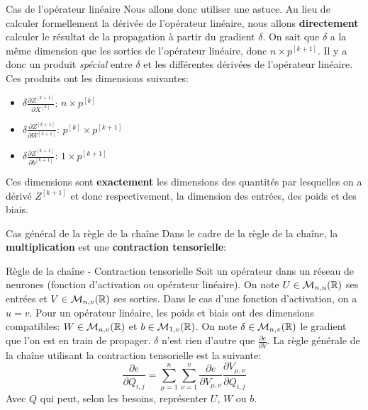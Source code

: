 \begin{frame}{Cas de l'opérateur linéaire}
	Nous allons donc utiliser une astuce. Au lieu de calculer formellement la dérivée de l'opérateur linéaire, nous allons \textbf{directement} calculer le résultat de la propagation à partir du gradient $\delta$. On sait que $\delta$ a la même dimension que les sorties de l'opérateur linéaire, donc $n \times p^{[k+1]}$. Il y a donc un produit \textit{spécial} entre $\delta$ et les différentes dérivées de l'opérateur linéaire. Ces produits ont les dimensions suivantes:
	
	\begin{itemize}
		\item $\delta \frac{\partial{Z^{[k+1]}}}{\partial{X^{[k]}}}$: $n \times p^{[k]}$
		\item $\delta \frac{\partial{Z^{[k+1]}}}{\partial{W^{[k+1]}}}$: $p^{[k]} \times p^{[k+1]}$
		\item $\delta \frac{\partial{Z^{[k+1]}}}{\partial{b^{[k+1]}}}$: $1 \times p^{[k+1]}$
	\end{itemize}
	
	Ces dimensions sont \textbf{exactement} les dimensions des quantités par lesquelles on a dérivé $Z^{[k+1]}$ et donc respectivement, la dimension des entrées, des poids et des biais.
\end{frame}

\begin{frame}{Cas général de la règle de la chaîne}
	Dans le cadre de la règle de la chaîne, la \textbf{multiplication} est une \textbf{contraction tensorielle}:
	
	\begin{block}{Règle de la chaîne - Contraction tensorielle}
		Soit un opérateur dans un réseau de neurones (fonction d'activation ou opérateur linéaire). On note $U \in \mathcal{M}_{n, u}(\mathbb{R})$ ses entrées et $V \in \mathcal{M}_{n, v}(\mathbb{R})$ ses sorties. Dans le cas d'une fonction d'activation, on a $u = v$. Pour un opérateur linéaire, les poids et biais ont des dimensions compatibles: $W \in \mathcal{M}_{u, v}(\mathbb{R})$ et $b \in \mathcal{M}_{1, v}(\mathbb{R})$. On note $\delta \in \mathcal{M}_{n, v}(\mathbb{R})$ le gradient que l'on est en train de propager. $\delta$ n'est rien d'autre que $\frac{\partial{e}}{\partial{V}}$.
		La règle générale de la chaîne utilisant la contraction tensorielle est la suivante:
		\begin{equation*}
			\frac{\partial{e}}{\partial{Q_{i,j}}} = \sum_{\mu=1}^n \sum_{\nu=1}^v \frac{\partial{e}}{\partial{V_{\mu,\nu}}} \frac{\partial{V_{\mu,\nu}}}{\partial{Q_{i,j}}}
		\end{equation*}
		Avec $Q$ qui peut, selon les besoins, représenter $U$, $W$ ou $b$.
	\end{block}
\end{frame}


